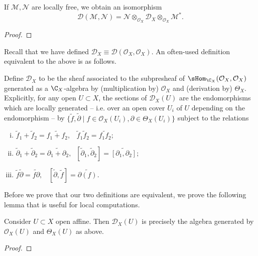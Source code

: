\begin{proposition}
    If $\mathcal{M},\mathcal{N}$ are locally free, we obtain an isomorphism
    \[\mathscr{D}(\mathcal{M},\mathcal{N})=\mathcal{N}\otimes_{\mathcal{O}_X}\mathscr{D}_X\otimes_{\mathcal{O}_X}\mathcal{M}^*.\]
\end{proposition}
\begin{proof}
\end{proof}

Recall that we have defined $\mathscr{D}_X\equiv\mathscr{D}(\mathcal{O}_X,\mathcal{O}_X)$.
An often-used definition equivalent to the above is as follows. 

\begin{definition}
    Define $\mathscr{D}_X$ to be the sheaf associated to the subpresheaf of $\sHom_{\C_X}(\mathcal{O}_X,\mathcal{O}_X)$
    generated as a $\C_X$-algebra by (multiplication by) $\mathcal{O}_X$ and (derivation by)
    $\Theta_X$. Explicitly, for any open $U\subset X$, the sections of $\mathscr{D}_X(U)$ are
    the endomorphisms which are locally generated -- i.e. over an open cover $U_i$ of $U$ depending
    on the endomorphism -- by 
    $\{\tilde f,\tilde \partial\mid f\in\mathcal{O}_X(U_i),\partial\in\Theta_X(U_i)\}$
    subject to the relations
    \begin{enumerate}[(i)]
        \item $\tilde f_1+\tilde f_2=\widetilde{f_1+f_2}, \;\;\; \tilde f_1\tilde f_2=\widetilde{f_1f_2};$
        \item $\tilde \partial_1 +\tilde \partial_2=\widetilde{\partial_1+\partial_2}, \;\; [\tilde\partial_1,\tilde\partial_2]=\widetilde{[\partial_1,\partial_2]};$
        \item $\tilde f\tilde \partial=\widetilde{f\partial}, \;\;\; [\tilde\partial,\tilde f]=\widetilde{\partial(f)}$.
    \end{enumerate}
    \label{def:D_X2}
\end{definition}

Before we prove that our two definitions are equivalent, we prove the following
lemma that is useful for local computations.
\begin{lemma}
    Consider $U\subset X$ open affine. Then $\mathscr{D}_X(U)$ is precisely
    the algebra generated by $\mathcal{O}_X(U)$ and $\Theta_X(U)$ as above.
    \label{lem:affine2}
\end{lemma}
\begin{proof}
\end{proof}


